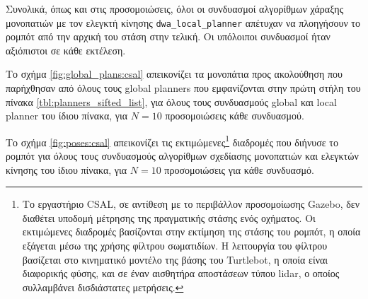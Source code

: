 Συνολικά, όπως και στις προσομοιώσεις, όλοι οι συνδυασμοί αλγορίθμων
χάραξης μονοπατιών με τον ελεγκτή κίνησης \texttt{dwa\_local\_planner}
απέτυχαν να πλοηγήσουν το ρομπότ από την αρχική του στάση στην τελική. Οι
υπόλοιποι συνδυασμοί ήταν αξιόπιστοι σε κάθε εκτέλεση.

Το σχήμα \ref{fig:global_plans:csal} απεικονίζει τα μονοπάτια προς
ακολούθηση που παρήχθησαν από όλους τους global planners που εμφανίζονται στην
πρώτη στήλη του πίνακα \ref{tbl:planners_sifted_list}, για όλους τους
συνδυασμούς global και local planner του ίδιου πίνακα, για $N=10$ προσομοιώσεις
κάθε συνδυασμού.

\begin{figure*}
\raggedright
  \begin{subfigure}[t]{\linewidth}\hspace{-1cm}
    
  \end{subfigure}%
  \vspace{-1.5cm}
  \begin{subfigure}[t]{\linewidth}\hspace{-1cm}
    
  \end{subfigure}%
  \vspace{-1.5cm}
  \begin{subfigure}[t]{\linewidth}\hspace{-1cm}
    
  \end{subfigure}%
  \caption{\small Τα σχεδιασθέντα μονοπάτια προς ακολούθηση $\bm{\mathcal{G}}$
           που παρήχθησαν από τους τρεις αλγορίθμους χάραξης μονοπατιών για
           κάθε συνδυασμό τους με ελεγκτή κίνησης του πίνακα
           \ref{tbl:planners_sifted_list}, σε σχέση με τις ορισμένες αρχικές και
           τελικές στάσεις του περιβάλλοντος CSAL}
  \label{fig:global_plans:csal}
\end{figure*}

Το σχήμα \ref{fig:poses:csal} απεικονίζει τις εκτιμώμενες\footnote{Το
εργαστήριο CSAL, σε αντίθεση με το περιβάλλον προσομοίωσης Gazebo, δεν διαθέτει
υποδομή μέτρησης της πραγματικής στάσης ενός οχήματος. Oι εκτιμώμενες διαδρομές
βασίζονται στην εκτίμηση της στάσης του ρομπότ, η οποία εξάγεται μέσω της
χρήσης φίλτρου σωματιδίων. Η λειτουργία του φίλτρου βασίζεται στο κινηματικό
μοντέλο της βάσης του Turtlebot, η οποία είναι διαφορικής φύσης, και σε έναν
αισθητήρα αποστάσεων τύπου lidar, ο οποίος συλλαμβάνει δισδιάστατες μετρήσεις.}
διαδρομές που διήνυσε το ρομπότ για όλους τους συνδυασμούς αλγορίθμων σχεδίασης
μονοπατιών και ελεγκτών κίνησης του ίδιου πίνακα, για $N=10$ προσομοιώσεις για
κάθε συνδυασμό.

